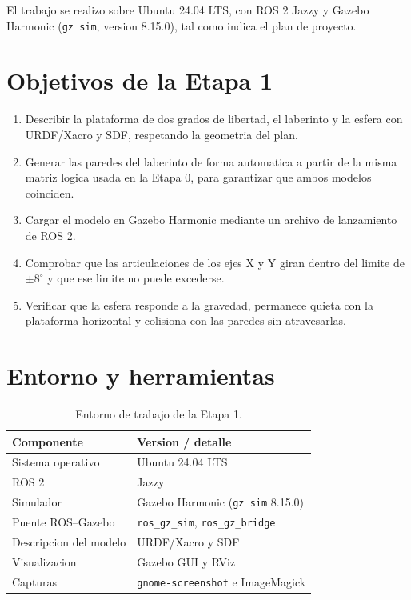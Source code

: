\documentclass[11pt,a4paper]{article}
\begin{document}
El trabajo se realizo sobre Ubuntu 24.04 LTS, con ROS 2 Jazzy y Gazebo Harmonic (\texttt{gz sim}, version 8.15.0), tal como indica el plan de proyecto.

\section{Objetivos de la Etapa 1}
\begin{enumerate}
    \item Describir la plataforma de dos grados de libertad, el laberinto y la esfera con URDF/Xacro y SDF, respetando la geometria del plan.
    \item Generar las paredes del laberinto de forma automatica a partir de la misma matriz logica usada en la Etapa 0, para garantizar que ambos modelos coinciden.
    \item Cargar el modelo en Gazebo Harmonic mediante un archivo de lanzamiento de ROS 2.
    \item Comprobar que las articulaciones de los ejes X y Y giran dentro del limite de $\pm 8^\circ$ y que ese limite no puede excederse.
    \item Verificar que la esfera responde a la gravedad, permanece quieta con la plataforma horizontal y colisiona con las paredes sin atravesarlas.
\end{enumerate}

\section{Entorno y herramientas}
\begin{table}[H]
    \centering
    \begin{tabular}{@{}ll@{}}
        \toprule
        \textbf{Componente} & \textbf{Version / detalle} \\
        \midrule
        Sistema operativo & Ubuntu 24.04 LTS \\
        ROS 2 & Jazzy \\
        Simulador & Gazebo Harmonic (\texttt{gz sim} 8.15.0) \\
        Puente ROS--Gazebo & \texttt{ros\_gz\_sim}, \texttt{ros\_gz\_bridge} \\
        Descripcion del modelo & URDF/Xacro y SDF \\
        Visualizacion & Gazebo GUI y RViz \\
        Capturas & \texttt{gnome-screenshot} e ImageMagick \\
        \bottomrule
    \end{tabular}
    \caption{Entorno de trabajo de la Etapa 1.}
    \label{tab:entorno}
\end{table}
\end{document}
